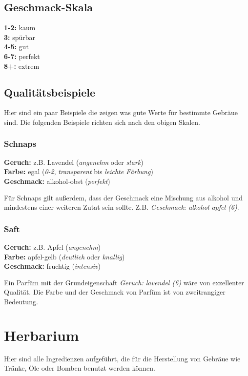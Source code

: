 \subsection{Geschmack-Skala}
\textbf{1-2:} kaum \\
\textbf{3:} spürbar \\
\textbf{4-5:} gut \\
\textbf{6-7:} perfekt \\
\textbf{8+:} extrem

\subsection{Qualitätsbeispiele}
Hier sind ein paar Beispiele die zeigen was gute Werte für bestimmte Gebräue sind. Die folgenden Beispiele richten sich nach den obigen Skalen.

\subsubsection{Schnaps}
\textbf{Geruch:} z.B. Lavendel (\textit{angenehm} oder \textit{stark}) \\
\textbf{Farbe:} egal (\textit{0-2}, \textit{transparent} bis \textit{leichte Färbung}) \\
\textbf{Geschmack:} alkohol-obst (\textit{perfekt})

Für Schnaps gilt außerdem, dass der Geschmack eine Mischung aus alkohol und mindestens einer weiteren Zutat sein sollte. Z.B. \textit{Geschmack: alkohol-apfel (6)}.

\subsubsection{Saft}
\textbf{Geruch:} z.B. Apfel (\textit{angenehm}) \\
\textbf{Farbe:} apfel-gelb (\textit{deutlich} oder \textit{knallig}) \\
\textbf{Geschmack:} fruchtig (\textit{intensiv})

Ein Parfüm mit der Grundeigenschaft \textit{Geruch: lavendel (6)} wäre von exzellenter Qualität. Die Farbe und der Geschmack von Parfüm ist von zweitrangiger Bedeutung.


\section{Herbarium}
Hier sind alle Ingredienzen aufgeführt, die für die Herstellung von Gebräue wie Tränke, Öle oder Bomben benutzt werden können.

